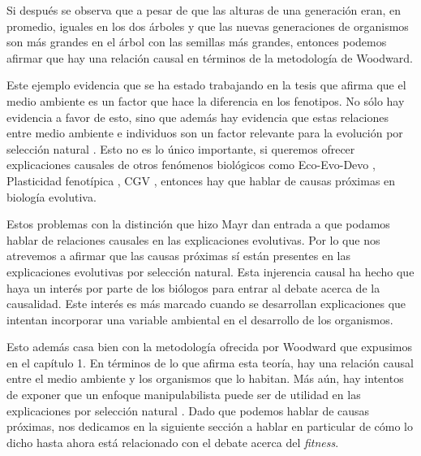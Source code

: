 Si después se observa que a pesar de que las alturas de una generación eran, en promedio, iguales en los dos árboles y que las nuevas generaciones de organismos son más grandes en el árbol con las semillas más grandes, entonces podemos afirmar que hay una relación causal en términos de la metodología de Woodward.

Este ejemplo evidencia que se ha estado trabajando en la tesis que afirma que el medio ambiente es un factor que hace la diferencia en los fenotipos. No sólo hay evidencia a favor de esto, sino que además hay evidencia que estas relaciones entre medio ambiente e individuos son un factor relevante para la evolución por selección natural \cite{Jablonka2020, Dayan2020, MacColl2011}. Esto no es lo único importante, si queremos ofrecer explicaciones causales de otros fenómenos biológicos como Eco-Evo-Devo \cite{PfenningEco-Evo-Devo}, Plasticidad fenotípica \cite{WESTEBERHARD20082701}, CGV \cite{CVG}, entonces hay que hablar de causas próximas en biología evolutiva.

Estos problemas con la distinción que hizo Mayr dan entrada a que podamos hablar de relaciones causales en las explicaciones evolutivas. Por lo que nos atrevemos a afirmar que las causas próximas sí están presentes en las explicaciones evolutivas por selección natural. Esta injerencia causal ha hecho que haya un interés por parte de los biólogos para entrar al debate acerca de la causalidad. Este interés es más marcado cuando se desarrollan explicaciones que intentan incorporar una variable ambiental en el desarrollo de los organismos.

Esto además casa bien con la metodología ofrecida por Woodward que expusimos en el capítulo 1. En términos de lo que afirma esta teoría, hay una relación causal entre el medio ambiente y los organismos que lo habitan. Más aún, hay intentos de exponer que un enfoque manipulabilista puede ser de utilidad en las explicaciones por selección natural \cite{MacColl2011}. Dado que podemos hablar de causas próximas, nos dedicamos en la siguiente sección a hablar en particular de cómo lo dicho hasta ahora está relacionado con el debate acerca del \emph{fitness}.





























